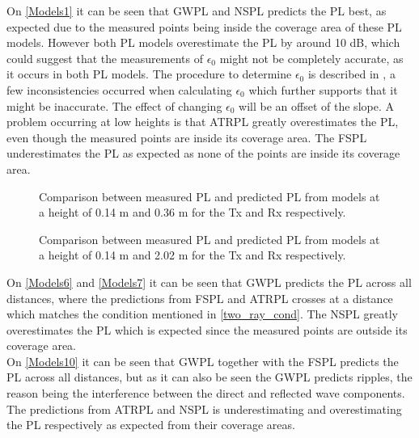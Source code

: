 


On \autoref{Models1} it can be seen that GWPL and NSPL predicts the PL best, as expected due to the measured points being inside the coverage area of these PL models. However both PL models overestimate the PL by around 10 dB, which could suggest that the measurements of $\epsilon_0$ might not be completely accurate, as it occurs in both PL models. The procedure to determine $\epsilon_0$ is described in \cite{Kim}, a few inconsistencies occurred when calculating $\epsilon_0$ which further supports that it might be inaccurate. The effect of changing $\epsilon_0$ will be an offset of the slope. A problem occurring at low heights is that ATRPL greatly overestimates the PL, even though the measured points are inside its coverage area. The FSPL underestimates the PL as expected as none of the points are inside its coverage area.


\begin{figure}[H]
\centering

\caption{Comparison between measured PL and predicted PL from models at a height of 0.14 m and 0.36 m for the Tx and Rx respectively.}
\label{Models6}
\end{figure}


\begin{figure}[!htbp]
\centering

\caption{Comparison between measured PL and predicted PL from models at a height of 0.14 m and 2.02 m for the Tx and Rx respectively.}
\label{Models7}
\end{figure}

On \autoref{Models6} and \autoref{Models7} it can be seen that GWPL predicts the PL across all distances, where the predictions from FSPL and ATRPL crosses at a distance which matches the condition mentioned in \eqref{two_ray_cond}. The NSPL greatly overestimates the PL which is expected since the measured points are outside its coverage area.\\

On \autoref{Models10} it can be seen that GWPL together with the FSPL predicts the PL across all distances, but as it can also be seen the GWPL predicts ripples, the reason being the interference between the direct and reflected wave components. The predictions from ATRPL and NSPL is underestimating and overestimating the PL respectively as expected from their coverage areas.

